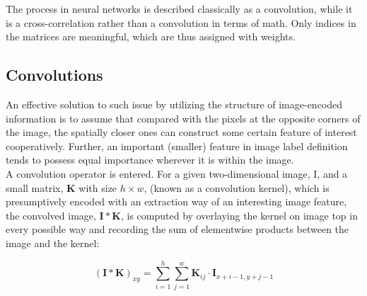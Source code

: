     The process in neural networks is described classically as a convolution, while it is a cross-correlation rather than a convolution in terms of math. Only indices in the matrices are meaningful, which are thus assigned with weights. 

    \subsection{Convolutions}
    An effective solution to such issue by utilizing the structure of image-encoded information is to assume that compared with the pixels at the opposite corners of the image, the spatially closer ones can construct some certain feature of interest cooperatively. Further, an important (smaller) feature in image label definition tends to possess equal importance wherever it is within the image. \\

    A convolution operator is entered. For a given two-dimensional image, I, and a small matrix, $\pmb{K}$ with size $h \times w$, (known as a convolution kernel), which is presumptively encoded with an extraction way of an interesting image feature, the convolved image, $\pmb{I} * \pmb{K}$, is computed by overlaying the kernel on image top  in every possible way and recording the sum of elementwise products between the image and the kernel:

    \begin{equation}
        (\pmb{I} * \pmb{K})_{xy} = \sum_{i=1}^{h}\sum_{j=1}^{w} \pmb{K}_{ij}\cdot \pmb{I}_{x+i-1, y+j-1}
    \end{equation}

